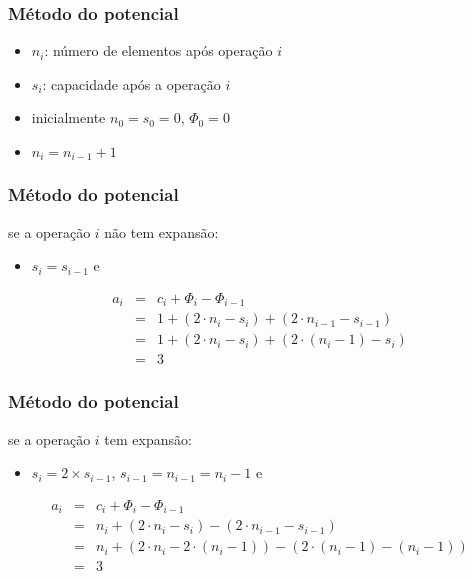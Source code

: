 \documentclass{beamer}
\begin{document}
\begin{frame}

\frametitle{Método do potencial}

\begin{itemize}
\item $n_i$: número de elementos após operação $i$
\item $s_i$: capacidade após a operação $i$
\item inicialmente $n_0 = s_0 = 0$, $\Phi_0 = 0$
\item $n_i = n_{i-1} + 1$
\end{itemize}

\end{frame}

\begin{frame}

\frametitle{Método do potencial}

se a operação $i$ não tem expansão:
\begin{itemize}
\item $s_i = s_{i-1}$ e 
\end{itemize}
\begin{eqnarray*}
a_i & = & c_i + \Phi_i - \Phi_{i-1} \\
    & = & 1 + (2 \cdot n_i - s_i) + (2 \cdot n_{i-1} - s_{i-1}) \\
    & = & 1 + (2 \cdot n_i - s_i) + (2 \cdot (n_i - 1) - s_i) \\
    & = & 3
\end{eqnarray*}

\end{frame}

\begin{frame}

\frametitle{Método do potencial}

se a operação $i$ tem expansão:
\begin{itemize}
\item $s_i = 2 \times s_{i-1}$, $s_{i-1} = n_{i-1} = n_i - 1$ e 
\end{itemize}
\begin{eqnarray*}
a_i & = & c_i + \Phi_i - \Phi_{i-1} \\
    & = & n_i + (2 \cdot n_i - s_i) - (2 \cdot n_{i-1} - s_{i-1}) \\
    & = & n_i + (2 \cdot n_i - 2 \cdot (n_i - 1)) - (2 \cdot (n_i - 1) - (n_i - 1)) \\
    & = & 3
\end{eqnarray*}

\end{frame}
\end{document}
